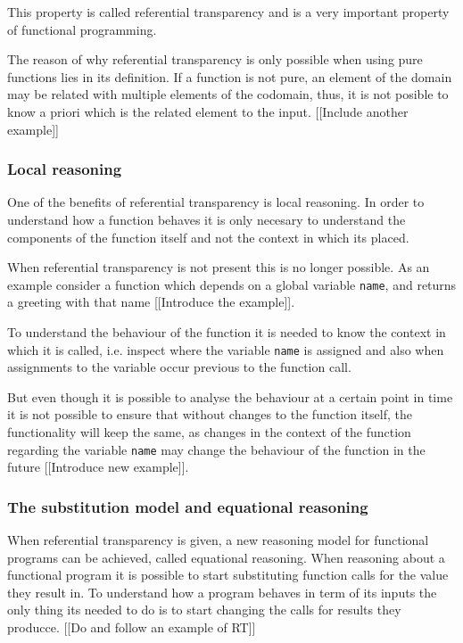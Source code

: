 \documentclass[../main.tex]{subfiles}
\begin{document}
This property is called referential transparency \autocite{Strachey2000FundamentalLanguages} and is a very important property of functional programming.

The reason of why referential transparency is only possible when using pure functions lies in its definition. If a function is not pure, an element of the domain may be related with multiple elements of the codomain, thus, it is not posible to know a priori which is the related element to the input. [[Include another example]]

\subsubsection{Local reasoning}
One of the benefits of referential transparency is local reasoning. In order to understand how a function behaves it is only necesary to understand the components of the function itself and not the context in which its placed. 

When referential transparency is not present this is no longer possible. As an example consider a function which depends on a global variable \texttt{name}, and returns a greeting with that name [[Introduce the example]].

To understand the behaviour of the function it is needed to know the context in which it is called, i.e. inspect where the variable \texttt{name} is assigned and also when assignments to the variable occur previous to the function call.

But even though it is possible to analyse the behaviour at a certain point in time it is not possible to ensure that without changes to the function itself, the functionality will keep the same, as changes in the context of the function regarding the variable \texttt{name} may change the behaviour of the function in the future [[Introduce new example]].

\subsubsection{The substitution model and equational reasoning}

When referential transparency is given, a new reasoning model for functional programs can be achieved, called equational reasoning. When reasoning about a functional program it is possible to start substituting function calls for the value they result in.
To understand how a program behaves in term of its inputs the only thing its needed to do is to start changing the calls for results they producce. [[Do and follow an example of RT]]
\end{document}
